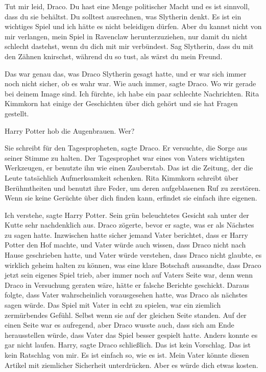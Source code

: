 \glqq Tut mir leid, Draco. Du hast eine Menge politischer Macht und es ist
sinnvoll, dass du sie behältst. Du solltest ausrechnen, was Slytherin denkt. Es
ist ein wichtiges Spiel und ich hätte es nicht beleidigen dürfen. Aber du kannst
nicht von mir verlangen, mein Spiel in Ravenclaw herunterzuziehen, nur damit du
nicht schlecht dastehst, wenn du dich mit mir verbündest. Sag Slytherin, dass du
mit den Zähnen knirschst, während du so tust, als wärst du mein Freund.\grqq{}

Das war genau das, was Draco Slytherin gesagt hatte, und er war sich immer noch
nicht sicher, ob es wahr war. \glqq Wie auch immer\grqq{}, sagte Draco. \glqq Wo
wir gerade bei deinem Image sind. Ich fürchte, ich habe ein paar schlechte
Nachrichten. Rita Kimmkorn hat einige der Geschichten über dich gehört und sie
hat Fragen gestellt.\grqq{}

Harry Potter hob die Augenbrauen. \glqq Wer?\grqq{}

\glqq Sie schreibt für den Tagespropheten\grqq{}, sagte Draco. Er versuchte, die
Sorge aus seiner Stimme zu halten. Der Tagesprophet war eines von Vaters
wichtigsten Werkzeugen, er benutzte ihn wie einen Zauberstab. \glqq Das ist die
Zeitung, der die Leute tatsächlich Aufmerksamkeit schenken. Rita Kimmkorn
schreibt über Berühmtheiten und benutzt ihre Feder, um deren aufgeblasenen Ruf
zu zerstören. Wenn sie keine Gerüchte über dich finden kann, erfindet sie
einfach ihre eigenen.\grqq{}

\glqq Ich verstehe\grqq{}, sagte Harry Potter. Sein grün beleuchtetes Gesicht
sah unter der Kutte sehr nachdenklich aus. Draco zögerte, bevor er sagte, was er
als Nächstes zu sagen hatte. Inzwischen hatte sicher jemand Vater berichtet,
dass er Harry Potter den Hof machte, und Vater würde auch wissen, dass Draco
nicht nach Hause geschrieben hatte, und Vater würde verstehen, dass Draco nicht
glaubte, es wirklich geheim halten zu können, was eine klare Botschaft
aussandte, dass Draco jetzt sein eigenes Spiel trieb, aber immer noch auf Vaters
Seite war, denn wenn Draco in Versuchung geraten wäre, hätte er falsche Berichte
geschickt. Daraus folgte, dass Vater wahrscheinlich vorausgesehen hatte, was
Draco als nächstes sagen würde. Das Spiel mit Vater in echt zu spielen, war ein
ziemlich zermürbendes Gefühl. Selbst wenn sie auf der gleichen Seite standen.
Auf der einen Seite war es aufregend, aber Draco wusste auch, dass sich am Ende
herausstellen würde, dass Vater das Spiel besser gespielt hatte. Anders konnte
es gar nicht laufen. \glqq Harry\grqq{}, sagte Draco schließlich. \glqq Das ist
kein Vorschlag. Das ist kein Ratschlag von mir. Es ist einfach so, wie es ist.
Mein Vater könnte diesen Artikel mit ziemlicher Sicherheit unterdrücken. Aber es
würde dich etwas kosten.\grqq{}

